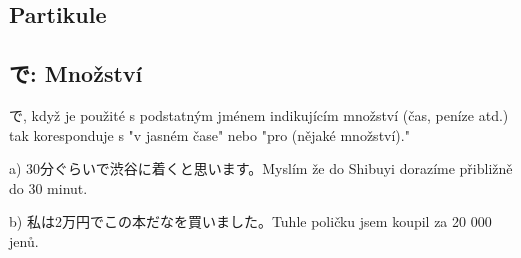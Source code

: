 \subsection{Partikule}

\subsection{ で: Množství}
で, když je použité s podstatným jménem indikujícím množství (čas, peníze atd.) tak koresponduje s "v jasném čase" nebo "pro (nějaké množství)."

a) 30分ぐらいで渋谷に着くと思います。Myslím že do Shibuyi dorazíme přibližně do 30 minut.

b) 私は2万円でこの本だなを買いました。Tuhle poličku jsem koupil za 20 000 jenů.



